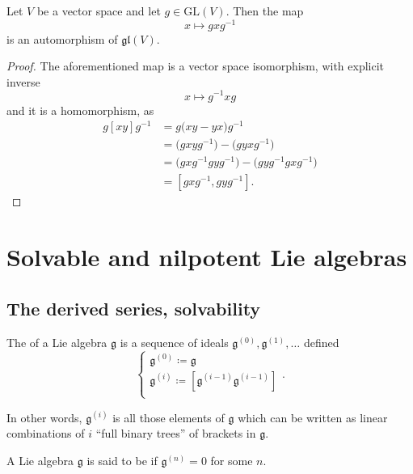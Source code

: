 \documentclass{article}
\newcommand{\lb}[1]{\ensuremath{\left[{#1}\right]}}
\newcommand*\frkg{{\ensuremath{\mathfrak{g}}}}
\newcommand*\GL{\ensuremath{\text{GL}}}
\newcommand*\glalg{\ensuremath{\mathfrak{gl}}}
\begin{document}
\begin{proposition}
    Let $V$ be a vector space and let $g \in \GL(V)$.
    Then the map
    \[
        x \mapsto gxg^{-1}
    \]
    is an automorphism of $\glalg(V)$.
\end{proposition}
\begin{proof}
    The aforementioned map is a vector space isomorphism, with explicit inverse
    \[
        x \mapsto g^{-1}xg
    \]
    and it is a homomorphism, as
    \begin{align*}
        g\lb{xy}g^{-1}
        &=
        g\Big(xy - yx\Big)g^{-1}
        \\
        &=
        \Big(gxyg^{-1}\Big)
        -
        \Big(gyxg^{-1}\Big)
        \\
        &=
        \Big(gxg^{-1}gyg^{-1}\Big)
        -
        \Big(gyg^{-1}gxg^{-1}\Big)
        \\
        &=
        \lb{gxg^{-1},gyg^{-1}}.
    \end{align*}
\end{proof}

\section{Solvable and nilpotent Lie algebras}

\subsection{The derived series, solvability}

\begin{definition}
    The  of a Lie algebra $\frkg$ is a sequence of ideals $\frkg^{(0)}, \frkg^{(1)}, \ldots$ defined
    \[
        \begin{cases}
            \frkg^{(0)} \coloneq \frkg \\
            \frkg^{(i)} \coloneq \lb{\frkg^{(i-1)}\frkg^{(i-1)}} \\
        \end{cases}.
    \]
\end{definition}

In other words, $\frkg^{(i)}$ is all those elements of $\frkg$ which can be written as linear combinations of $i$ ``full binary trees'' of brackets in $\frkg$.

\begin{definition}
    A Lie algebra $\frkg$ is said to be  if $\frkg^{(n)} = 0$ for some $n$.
\end{definition}
\end{document}
